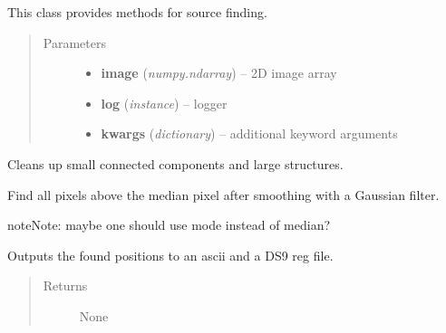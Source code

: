 \documentclass[a4paper,12pt,english]{sphinxmanual}
\begin{document}
\begin{fulllineitems}
This class provides methods for source finding.
\begin{quote}\begin{description}
\item[{Parameters}] \leavevmode\begin{itemize}
\item {} 
\textbf{image} (\emph{numpy.ndarray}) -- 2D image array

\item {} 
\textbf{log} (\emph{instance}) -- logger

\item {} 
\textbf{kwargs} (\emph{dictionary}) -- additional keyword arguments

\end{itemize}

\end{description}\end{quote}

\begin{fulllineitems}
Cleans up small connected components and large structures.

\end{fulllineitems}


\begin{fulllineitems}
Find all pixels above the median pixel after smoothing with a Gaussian filter.

\begin{notice}{note}{Note:}
maybe one should use mode instead of median?
\end{notice}

\end{fulllineitems}


\begin{fulllineitems}
Outputs the found positions to an ascii and a DS9 reg file.
\begin{quote}\begin{description}
\item[{Returns}] \leavevmode
None


\end{description}
\end{quote}
\end{fulllineitems}
\end{fulllineitems}
\end{document}
